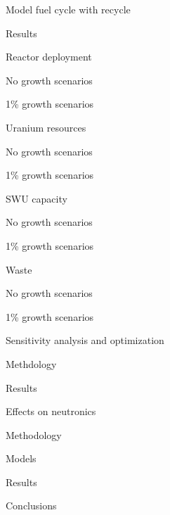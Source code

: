 \documentclass{report}
\begin{document}
\begin{outline}
\item Model fuel cycle with recycle 
\begin{outline}
    \item Results
    \begin{outline}
        \item Reactor deployment
        \begin{outline}
            \item No growth scenarios
            \item 1\% growth scenarios
        \end{outline}
        \item Uranium resources
        \begin{outline}
            \item No growth scenarios
            \item 1\% growth scenarios
        \end{outline}
        \item SWU capacity
        \begin{outline}
            \item No growth scenarios
            \item 1\% growth scenarios
        \end{outline}
        \item Waste
        \begin{outline}
            \item No growth scenarios
            \item 1\% growth scenarios
        \end{outline}
    \end{outline}
\end{outline}

\item Sensitivity analysis and optimization
\begin{outline}
    \item Methdology
    \item Results
\end{outline}

\item Effects on neutronics
\begin{outline}
    \item Methodology
    \item Models
    \item Results
\end{outline}

\item Conclusions
\end{outline}




\end{document}
